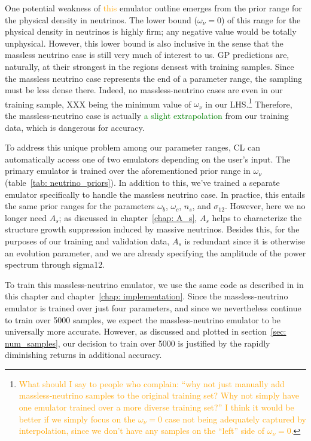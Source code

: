 One potential weakness of \textcolor{orange}{this} emulator outline emerges 
from the prior range for the physical density in neutrinos. The lower bound 
($\omega_\nu = 0$) of this range for the physical density in neutrinos is 
highly firm; any negative value would be totally unphysical. However, this 
lower bound is also inclusive in the sense that the massless neutrino case is 
still very much of interest to us. GP predictions are, naturally, at their 
strongest in the regions densest with training samples. Since the massless 
neutrino case represents the end of a parameter range, the sampling must be 
less dense there. Indeed, no massless-neutrino cases are even in our training 
sample, XXX being the minimum value of $\omega_\nu$ in our 
LHS.\footnote{\textcolor{orange}{What should I say to people who complain: 
``why not just manually add massless-neutrino samples to the original training 
set? Why not simply have one emulator trained over a more diverse training 
set?'' I think it would be better if we simply focus on the $\omega_\nu = 0$
case not being adequately captured by interpolation, since we don't have any
samples on the ``left'' side of $\omega_\nu = 0$.}}
Therefore, the massless-neutrino case is actually \textcolor{green}{a slight
extrapolation} from our training data, which is dangerous for accuracy.

To 
address this unique problem among our parameter ranges, CL can automatically 
access one of two emulators depending on the user’s input. The primary 
emulator is trained over the aforementioned prior range in $\omega_\nu$
(table~\ref{tab: neutrino_priors}). In addition to this, we’ve trained a 
separate emulator specifically to handle the massless neutrino case. In 
practice, this entails the same prior ranges for the parameters $\omega_b$, 
$\omega_c$, $n_s$, and $\sigma_{12}$. However, here we no longer need $A_s$;
as discussed in chapter~\ref{chap: A_s}, $A_s$ helps to characterize the
structure growth suppression induced by massive neutrinos. Besides this, for 
the purposes of our training and validation data, $A_s$ is redundant since it
is otherwise an evolution parameter, and we are already specifying the 
amplitude of the power spectrum through sigma12. 

To train this massless-neutrino emulator, we use the same code as described in 
in this chapter and chapter~\ref{chap: implementation}. Since the
massless-neutrino emulator is trained over just four parameters, and since we 
nevertheless continue to train over 5000 samples, we expect the
massless-neutrino emulator to be universally more accurate. However, as
discussed and plotted in section~\ref{sec: num_samples}, our decision to train 
over 5000 is justified by the rapidly diminishing returns in additional 
accuracy.

